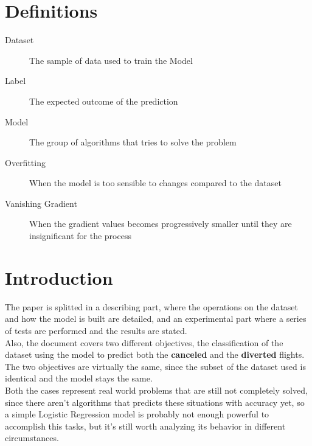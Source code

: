 \documentclass[
	letterpaper, %
	10pt, %
]{class}
\begin{document}
\section{Definitions}\label{definitions} %

\begin{description}
    \item[Dataset] The sample of data used to train the Model
    \item[Label] The expected outcome of the prediction
    \item[Model] The group of algorithms that tries to solve the problem
    \item[Overfitting] When the model is too sensible to changes compared to the dataset
    \item[Vanishing Gradient] When the gradient values becomes progressively smaller until they are insignificant for the process
\end{description}


\section{Introduction}

The paper is splitted in a describing part, where the operations on the dataset and how the model is built are detailed, and an experimental part where a series of tests are performed and the results are stated.\\

Also, the document covers two different objectives, the classification of the dataset using the model to predict both the \textbf{canceled} and the \textbf{diverted} flights.\\
The two objectives are virtually the same, since the subset of the dataset used is identical and the model stays the same.\\

Both the cases represent real world problems that are still not completely solved, since there aren't algorithms that predicts these situations with accuracy yet, so a simple Logistic Regression model is probably not enough powerful to accomplish this tasks, but it's still worth analyzing its behavior in different circumstances.
\end{document}
